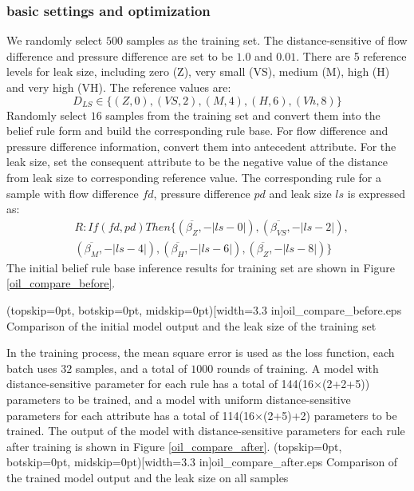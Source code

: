 \documentclass{ieeeaccess}
\begin{document}
\subsubsection{basic settings and optimization}
We randomly select $500$ samples as the training set.
The distance-sensitive of flow difference and pressure difference are set to be $1.0$ and $0.01$.
There are 5 reference levels for leak size, including zero (Z), very small (VS), medium (M), high (H) and very high (VH).
The reference values are:
\begin{equation}
    D_{LS}\in \{(Z,0),(VS,2),(M,4),(H,6),(Vh,8)\}
\end{equation}
Randomly select $16$ samples from the training set and convert them into the belief rule form and build the corresponding rule base.
For flow difference and pressure difference information, convert them into antecedent attribute.
For the leak size, set the consequent attribute to be the negative value of the distance from leak size to corresponding reference value.
The corresponding rule for a sample with flow difference $fd$, pressure difference $pd$ and leak size $ls$ is expressed as:
\begin{equation}
    \begin{split}
        &R:If(fd,pd)Then\{(\overline{\beta_{Z}},-|ls-0|),(\overline{\beta_{VS}},-|ls-2|),\\
        &(\overline{\beta_{M}},-|ls-4|),(\overline{\beta_{H}},-|ls-6|),(\overline{\beta_{Z}},-|ls-8|)\}
    \end{split}
\end{equation}
The initial belief rule base inference results for training set are shown in Figure \ref{oil_compare_before}.

\Figure[!t](topskip=0pt, botskip=0pt, midskip=0pt)[width=3.3 in]{oil_compare_before.eps}
{Comparison of the initial model output and the leak size of the training set\label{oil_compare_before}}

In the training process, the mean square error is used as the loss function, each batch uses $32$ samples, and a total of $1000$ rounds of training.
A model with distance-sensitive parameter for each rule has a total of 144(16$\times$(2+2+5)) parameters to be trained,
and a model with uniform distance-sensitive parameters for each attribute has a total of 114(16$\times$(2+5)+2) parameters to be trained.
The output of the model with distance-sensitive parameters for each rule after training is shown in Figure \ref{oil_compare_after}.
\Figure[!t](topskip=0pt, botskip=0pt, midskip=0pt)[width=3.3 in]{oil_compare_after.eps}
{Comparison of the trained model output and the leak size on all samples\label{oil_compare_after}}
\end{document}
